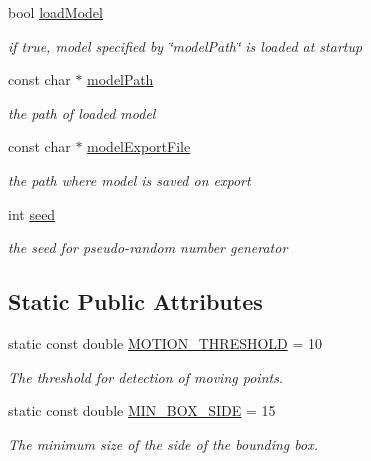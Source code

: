 \begin{DoxyCompactItemize}
bool \hyperlink{classMain_ad0301eff91ba4a68e41e28f238f5a743}{load\-Model}
\begin{DoxyCompactList}\small\item\em if true, model specified by \char`\"{}model\-Path\char`\"{} is loaded at startup \end{DoxyCompactList}\item 
const char $\ast$ \hyperlink{classMain_a47ef2693d73c1e51a329a50040e20892}{model\-Path}
\begin{DoxyCompactList}\small\item\em the path of loaded model \end{DoxyCompactList}\item 
const char $\ast$ \hyperlink{classMain_a3003ab9835173ebf15939e4b97143615}{model\-Export\-File}
\begin{DoxyCompactList}\small\item\em the path where model is saved on export \end{DoxyCompactList}\item 
int \hyperlink{classMain_a886ff721bab62f931d37b4a0a7ce4b2d}{seed}
\begin{DoxyCompactList}\small\item\em the seed for pseudo-\/random number generator \end{DoxyCompactList}\end{DoxyCompactItemize}
\subsection*{Static Public Attributes}
\begin{DoxyCompactItemize}
\item 
static const double \hyperlink{classMain_a8c4026ea3fe03e95d7f5484f560f71bb}{M\-O\-T\-I\-O\-N\-\_\-\-T\-H\-R\-E\-S\-H\-O\-L\-D} = 10
\begin{DoxyCompactList}\small\item\em The threshold for detection of moving points. \end{DoxyCompactList}\item 
static const double \hyperlink{classMain_a6246be52b3709cc7114173579fb45eb0}{M\-I\-N\-\_\-\-B\-O\-X\-\_\-\-S\-I\-D\-E} = 15
\begin{DoxyCompactList}\small\item\em The minimum size of the side of the bounding box. \end{DoxyCompactList}\end{DoxyCompactItemize}


